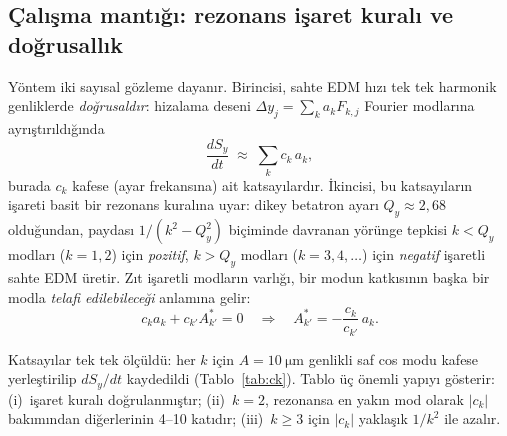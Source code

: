 \documentclass[preprint,12pt]{elsarticle}
\begin{document}
\subsection{Çalışma mantığı: rezonans işaret kuralı ve doğrusallık}
\label{sec:trim-mantik}

Yöntem iki sayısal gözleme dayanır. Birincisi, sahte EDM hızı tek tek
harmonik genliklerde \emph{doğrusaldır}: hizalama deseni
$\Delta y_j = \sum_k a_k F_{k,j}$ Fourier modlarına ayrıştırıldığında
\begin{equation}
  \frac{dS_y}{dt} \;\approx\; \sum_k c_k\, a_k,
  \label{eq:trim-lineer}
\end{equation}
burada $c_k$ kafese (ayar frekansına) ait katsayılardır. İkincisi, bu
katsayıların işareti basit bir rezonans kuralına uyar: dikey betatron ayarı
$Q_y\approx2{,}68$ olduğundan, paydası $1/(k^2-Q_y^2)$ biçiminde davranan
yörünge tepkisi $k<Q_y$ modları ($k=1,2$) için \emph{pozitif},
$k>Q_y$ modları ($k=3,4,\ldots$) için \emph{negatif} işaretli sahte EDM
üretir. Zıt işaretli modların varlığı, bir modun katkısının başka bir modla
\emph{telafi edilebileceği} anlamına gelir:
\begin{equation}
  c_k a_k + c_{k'} A^*_{k'} = 0
  \quad\Longrightarrow\quad
  A^*_{k'} = -\frac{c_k}{c_{k'}}\,a_k .
  \label{eq:trim-recete}
\end{equation}

Katsayılar tek tek ölçüldü: her $k$ için $A=\SI{10}{\micro\meter}$
genlikli saf cos modu kafese yerleştirilip $dS_y/dt$ kaydedildi
(Tablo~\ref{tab:ck}). Tablo üç önemli yapıyı gösterir:
(i)~işaret kuralı doğrulanmıştır;
(ii)~$k=2$, rezonansa en yakın mod olarak $|c_k|$ bakımından diğerlerinin
4--10 katıdır;
(iii)~$k\ge3$ için $|c_k|$ yaklaşık $1/k^2$ ile azalır.
\end{document}
